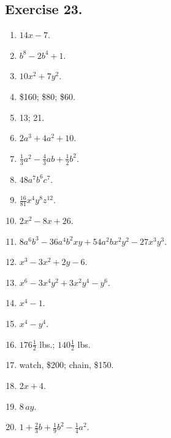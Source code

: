 \documentclass{book}
\begin{document}
\subsection*{Exercise 23.} \begin{enumerate}

\item $14x - 7$.

\item $b^8 - 2b^4 + 1$.

\item $10x^2 + 7y^2$.

\item \$160; \$80; \$60.

\item 13; 21.

\item $2a^3 + 4a^2 + 10$.

\item $\frac{1}{3} a^2 - \frac{4}{3} ab + \frac{1}{2} b^2$.

\item $48a^7 b^6 c^7$.

\item $\frac{16}{81}x^4 y^8 z^{12}$.

\item $2x^2 - 8x + 26$.

\item $8a^6 b^3 - 36a^4 b^2 xy + 54a^2 bx^2 y^2 - 27x^3 y^3$.

\item $x^3 - 3x^2 + 2y - 6$.

\item $x^6 - 3x^4 y^2 + 3x^2 y^4 - y^6$.

\item $x^4 - 1$.

\item $x^4 - y^4$.

\item $176\frac{1}{2}$ lbs.; $140\frac{1}{2}$ lbs.

\item watch, \$200; chain, \$150.

\item $2x + 4$.

\item $8\,ay$.

\item $1 + \frac{2}{3} b + \frac{1}{9} b^2 - \frac{1}{4} a^2$.
\end{enumerate}
\end{document}
